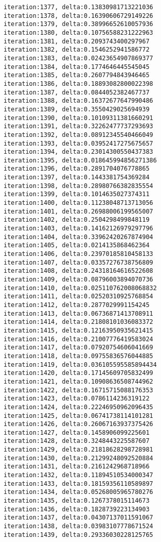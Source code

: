 \documentclass[11pt]{article}
\begin{document}
\begin{Verbatim}[commandchars=\\\{\}]
iteration:1377, delta:0.13830981713221036
iteration:1378, delta:0.16390606729149226
iteration:1379, delta:0.38996652610057936
iteration:1380, delta:0.10756588231222963
iteration:1381, delta:0.2093743400297967
iteration:1382, delta:0.1546252941586772
iteration:1383, delta:0.02423654907869377
iteration:1384, delta:0.1774646445545045
iteration:1385, delta:0.2607794843946465
iteration:1386, delta:0.18893082800022398
iteration:1387, delta:0.0844052382467737
iteration:1388, delta:0.16372677647990486
iteration:1389, delta:0.3550429025694939
iteration:1390, delta:0.10109311381660291
iteration:1391, delta:0.32262477737293693
iteration:1392, delta:0.08912345540466049
iteration:1393, delta:0.03952417275675657
iteration:1394, delta:0.23014300550437383
iteration:1395, delta:0.018645994856271386
iteration:1396, delta:0.2891704076778865
iteration:1397, delta:0.1443381754369284
iteration:1398, delta:0.28980766382835554
iteration:1399, delta:0.1014635027374311
iteration:1400, delta:0.11238048713713056
iteration:1401, delta:0.26988006199565007
iteration:1402, delta:0.2504298499848119
iteration:1403, delta:0.14162126979297796
iteration:1404, delta:0.33962420267874904
iteration:1405, delta:0.0214135868462364
iteration:1406, delta:0.23970185810458133
iteration:1407, delta:0.03357276738756809
iteration:1408, delta:0.24318164616522608
iteration:1409, delta:0.08796003894070736
iteration:1410, delta:0.025110762008068832
iteration:1411, delta:0.02520310925768854
iteration:1412, delta:0.2877029991154245
iteration:1413, delta:0.06736871413708911
iteration:1414, delta:0.21808101036083372
iteration:1415, delta:0.12163950935621415
iteration:1416, delta:0.21007776419583024
iteration:1417, delta:0.07920754606041669
iteration:1418, delta:0.09755836576044885
iteration:1419, delta:0.036105595585894434
iteration:1420, delta:0.17145609705832499
iteration:1421, delta:0.10908636508744962
iteration:1422, delta:0.16715715088176353
iteration:1423, delta:0.0786114236319122
iteration:1424, delta:0.22246950962096435
iteration:1425, delta:0.06741738114101281
iteration:1426, delta:0.26067163937375426
iteration:1427, delta:0.1458906099225601
iteration:1428, delta:0.3248443225587607
iteration:1429, delta:0.21818628298728981
iteration:1430, delta:0.21299248092520884
iteration:1431, delta:0.2161242968718966
iteration:1432, delta:0.11894510534000347
iteration:1433, delta:0.18159356110589897
iteration:1434, delta:0.05268005965780276
iteration:1435, delta:0.1267378015114673
iteration:1436, delta:0.1828739223134903
iteration:1437, delta:0.04307137011591067
iteration:1438, delta:0.03983107778671524
iteration:1439, delta:0.29336030228125765

\end{Verbatim}
\end{document}
